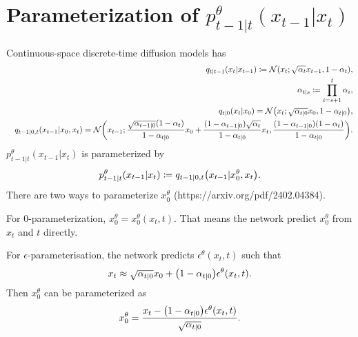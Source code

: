 \documentclass[10pt]{article}
\begin{document}
\section{Parameterization of $p^\theta_{t-1|t}(x_{t-1}|x_t)$}

Continuous-space discrete-time diffusion models has
\begin{eqnarray*}
  &&q_{t|t-1}(x_t|x_{t-1})\coloneq\mathcal{N}\qty(x_t;\sqrt{\alpha_t}x_{t-1}, 1-\alpha_t),\\
  &&\alpha_{t|s}\coloneq\prod_{i=s+1}^t \alpha_i,\\
  &&q_{t|0}(x_t|x_0)=\mathcal{N}\qty(x_t;\sqrt{\alpha_{t|0}}x_0, 1-\alpha_{t|0}),\\
  &&q_{t-1|0,t}(x_{t-1}|x_0,x_t)=\mathcal{N}\qty(x_{t-1};\frac{\sqrt{\alpha_{t-1|0}}(1-\alpha_t)}{1-\alpha_{t|0}}x_0 + \frac{(1-\alpha_{t-1|0})\sqrt{\alpha_t}}{1-\alpha_{t|0}}x_t, \frac{(1-\alpha_{t-1|0})(1-\alpha_t)}{1-\alpha_{t|0}}).
\end{eqnarray*}
$p_{t-1|t}^\theta(x_{t-1}|x_t)$ is parameterized by
\begin{eqnarray*}
  p_{t-1|t}^\theta(x_{t-1}|x_t) \coloneq q_{t-1|0,t}\qty(x_{t-1}|x^\theta_0, x_t).
\end{eqnarray*}
There are two ways to parameterize $x^\theta_0$ (https://arxiv.org/pdf/2402.04384). 

For $0$-parameterization, $x_0^\theta=x_0^\theta(x_t,t)$. That means the network predict $x_0^\theta$ from $x_t$ and $t$ directly.

For $\epsilon$-parameterisation, the network predicts $\epsilon^\theta(x_t,t)$ such that
\begin{eqnarray*}
  x_t\approx \sqrt{\alpha_{t|0}} x_0 + \qty(1-\alpha_{t|0}) \epsilon^\theta(x_t,t).
\end{eqnarray*}
Then $x_0^\theta$ can be parameterized as
\begin{eqnarray*}
  x^\theta_0 = \frac{x_t - \qty(1-\alpha_{t|0}) \epsilon^\theta(x_t,t)}{\sqrt{\alpha_{t|0}}}.
\end{eqnarray*}
\end{document}
